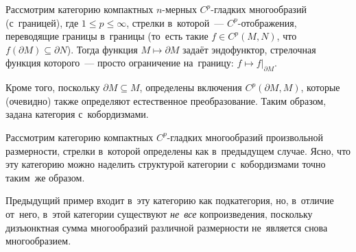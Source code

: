 \documentclass[a4paper,oneside]{article}
\begin{document}
\begin{example}
Рассмотрим категорию компактных $n$-мерных $C^p$-гладких многообразий (с~границей),
где $1 \leq p \leq \infty$, стрелки в~которой~— $C^p$-отображения, переводящие границы в~границы (то~есть такие $f \in C^p(M, N)$,
что $f(\partial M) \subseteq \partial N$). Тогда функция $M \mapsto \partial M$ задаёт эндофунктор,
стрелочная функция которого~— просто ограничение на~границу: $f \mapsto f|_{\partial M}$.

Кроме того, поскольку $\partial M \subseteq M$, определены включения $C^p(\partial M, M)$,
которые (очевидно) также определяют естественное преобразование. Таким образом, задана категория с~кобордизмами.
\end{example}

\begin{example}
Рассмотрим категорию компактных $C^p$-гладких многообразий произвольной размерности,
стрелки в~которой определены как в~предыдущем случае. Ясно, что эту категорию можно наделить структурой
категории с~кобордизмами точно таким~же образом.

Предыдущий пример входит в~эту категорию как подкатегория, но, в~отличие от~него, в~этой категории
существуют \textit{не~все} копроизведения, поскольку дизъюнктная сумма многообразий различной размерности
не~является снова многообразием.
\end{example}
\end{document}
